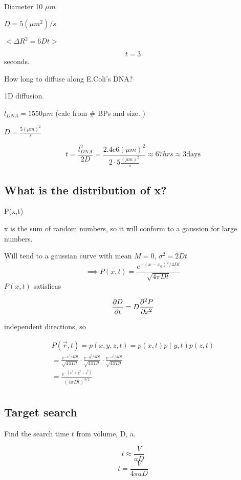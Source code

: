 \documentclass{article}
\begin{document}
Diameter 10 $\mu m $

$D = 5(\mu  m ^2)/s$

$<\Delta R^2 = 6Dt>$

\begin{equation}
	t = 3
\end{equation}
seconds. 


How long to diffuse along E.Coli's DNA? 

1D diffusion. 

$l_{DNA} = 1550 \mu m$  (calc from \# BPs and size. )

$D= \frac{5 (\mu m )^2}{s}$

\begin{equation}
	t = \frac{l_{DNA}^2}{2D} = \frac{2.4e6(\mu m )^2}{2\cdot 5 \frac{(\mu m )^2}{s}} \approx 67 hrs \approx 3 \text{days}
\end{equation}


\subsection{What is the distribution of x?}
P(x,t)

x is the sum of random numbers, so it will conform to a gaussion for large numbers. 

Will tend to a gaussian curve with mean $M = 0$, $\sigma^2 = 2Dt$ 
\begin{equation}
	\implies P(x,t) = \frac{e ^ {-(x-x_0)^2/4Dt}}{\sqrt{4\pi Dt}}
\end{equation}
$P(x,t)$ satisfieas 

\begin{equation}
	\pdv {D}{t} = D\pdv[2] {P}{x}
\end{equation}

independent directions, so 

\begin{equation}
	\begin{split}
	P(\vec r , t ) = p(x,y,z,t) = p(x,t)p(y,t)p(z,t)\\
	= \frac{e^{-x^2/4Dt}}{\sqrt{4\pi Dt}}\cdot
	 \frac{e^{-y^2/4Dt}}{\sqrt{4\pi Dt}}\cdot
	 \frac{e^{-z^2/4Dt}}{\sqrt{4\pi Dt}}\\
	 = \frac{e^{-(x^2 + y^2 + z^2)}}{(4\pi Dt)^{3/2}}\\
	\end{split}
\end{equation}


\subsection{Target search}
Find the search time $t$ from volume, D, a. 


\begin{equation}
	t \approx \frac{V}{aD}
\end{equation}
\begin{equation}
	t = \frac{V}{4\pi aD}
\end{equation}
\end{document}
